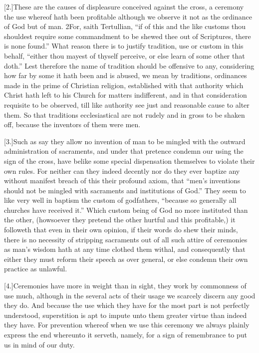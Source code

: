 [2.]These are the causes of displeasure conceived against the cross, a ceremony the use whereof hath been profitable although we observe it not as the ordinance of God but of man. 2For, saith Tertullian, “if of this and the like customs thou shouldest require some commandment to be shewed thee out of Scriptures, there is none found.” What reason there is to justify tradition, use or custom in this behalf, “either thou mayest of thyself perceive, or else learn of some other that doth.” Lest therefore the name of tradition should be offensive to any, considering how far by some it hath been and is abused, we mean by traditions, ordinances made in the prime of Christian religion, established with that authority which Christ hath left to his Church for matters indifferent, and in that consideration requisite to be observed, till like authority see just and reasonable cause to alter them. So that traditions ecclesiastical are not rudely and in gross to be shaken off, because the inventors of them were men.

[3.]Such as say they allow no invention of man to be  mingled with the outward administration of sacraments, and under that pretence condemn our using the sign of the cross, have belike some special dispensation themselves to violate their own rules.
 For neither can they indeed decently nor do they ever baptize any without manifest breach of this their profound axiom, that “men’s inventions should not be mingled with sacraments and institutions of God.” They seem to like very well in baptism the custom of godfathers, “because so generally all churches have received it.” Which custom being of God no more instituted than the other, (howsoever they pretend the other hurtful and this profitable,) it followeth that even in their own opinion, if their words do shew their minds, there is no necessity of stripping sacraments out of all such attire of ceremonies as man’s wisdom hath at any time clothed them withal, and consequently that either they must reform their speech as over general, or else condemn their own practice as unlawful.

[4.]Ceremonies have more in weight than in sight, they work by commonness of use much, although in the several acts of their usage we scarcely discern any good they do. And because the use which they have for the most part is not perfectly understood, superstition is apt to impute unto them greater virtue than indeed they have. For prevention whereof when we use this ceremony we always plainly express the end whereunto it serveth, namely, for a sign of remembrance to put us in mind of our duty.

